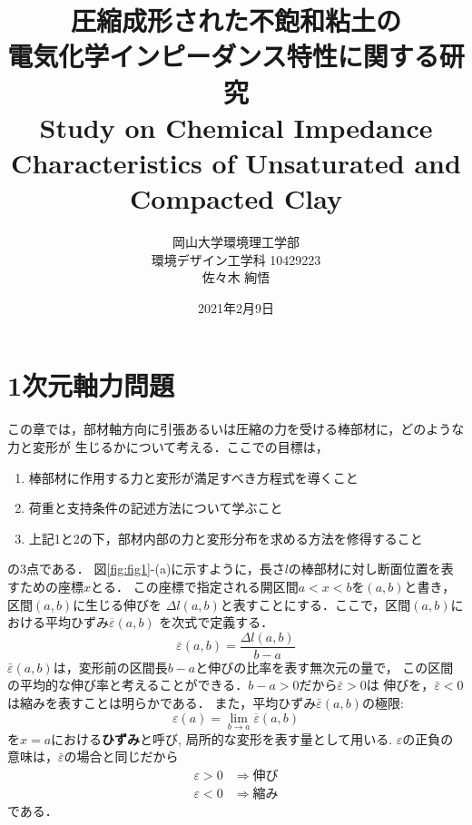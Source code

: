 \documentclass[11pt,a4j]{mybook2}
\title{
\vspace{20mm}
圧縮成形された不飽和粘土の\\
電気化学インピーダンス特性に関する研究
\\
\vspace{5mm}
Study on Chemical Impedance Characteristics 
of Unsaturated and Compacted Clay
\vspace{60mm}
}
\date{2021年2月9日}
\author{
	\vspace{40mm}
岡山大学環境理工学部\\
環境デザイン工学科 10429223\\
	佐々木 絢悟}
\begin{document}
\maketitle
\tableofcontents
\frontmatter
\mainmatter
\chapter{1次元軸力問題}

この章では，部材軸方向に引張あるいは圧縮の力を受ける棒部材に，どのような力と変形が
生じるかについて考える．ここでの目標は，
\begin{enumerate}
\item
	棒部材に作用する力と変形が満足すべき方程式を導くこと
\item
	荷重と支持条件の記述方法について学ぶこと
\item
	上記1と2の下，部材内部の力と変形分布を求める方法を修得すること
\end{enumerate}
の3点である．
図\ref{fig:fig1}-(a)に示すように，長さ$l$の棒部材に対し断面位置を表すための座標$x$とる．
この座標で指定される開区間$a<x<b$を$(a,b)$と書き，区間$(a,b)$に生じる伸びを
$\Delta l (a,b)$と表すことにする．ここで，区間$(a,b)$における平均ひずみ$\overline{\varepsilon}(a,b)$
を次式で定義する．
\begin{equation}
	\overline{\varepsilon}(a,b) =\frac{\Delta l (a,b)}{b-a}
	\label{eqn:eps_bar}
\end{equation}
$\bar \varepsilon(a,b)$は，変形前の区間長$b-a$と伸びの比率を表す無次元の量で，
この区間の平均的な伸び率と考えることができる．$b-a>0$だから$\bar{\varepsilon}>0$は
伸びを，$\bar{\varepsilon}<0$は縮みを表すことは明らかである．
また，平均ひずみ$\bar{\varepsilon}(a,b)$の極限:
\begin{equation}
	\varepsilon(a)=\lim_{b \rightarrow a}\overline{\varepsilon}(a,b)
	\label{eqn:eps_def}
\end{equation}
を$x=a$における{\rm \bf ひずみ}と呼び, 局所的な変形を表す量として用いる. 
$\varepsilon$の正負の意味は，$\bar\varepsilon$の場合と同じだから
\[
	\begin{array}{cc}
		\varepsilon >0 & \Rightarrow 伸び \\
		\varepsilon <0 & \Rightarrow 縮み
	\end{array}
\]
である．\\
\end{document}
